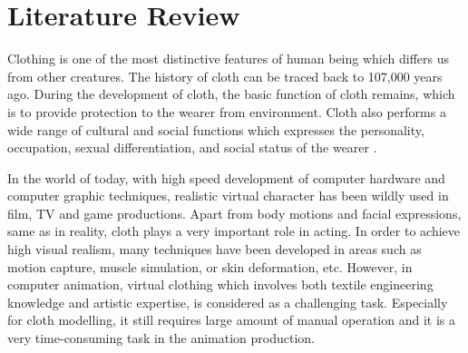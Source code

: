 
\ifx\isEmbedded\undefined

\graphicspath{{../images/}}

\fi


\chapter{Literature Review}
\label{cha:literature_review}

Clothing is one of the most distinctive features of human being which differs us from other creatures. The history of cloth can be traced back to 107,000 years ago. During the development of cloth, the basic function of cloth remains, which is to provide protection to the wearer from environment. Cloth also performs a wide range of cultural and social functions which expresses the personality, occupation, sexual differentiation, and social status of the wearer .

In the world of today, with high speed development of computer hardware and computer graphic techniques, realistic virtual character has been wildly used in film, TV and game productions. Apart from body motions and facial expressions, same as in reality, cloth plays a very important role in acting. In order to achieve high visual realism, many techniques have been developed in areas such as motion capture, muscle simulation, or skin deformation, etc. However, in computer animation, virtual clothing which involves both textile engineering knowledge and artistic expertise, is considered as a challenging task. Especially for cloth modelling, it still requires large amount of manual operation and it is a very time-consuming task in the animation production. 


